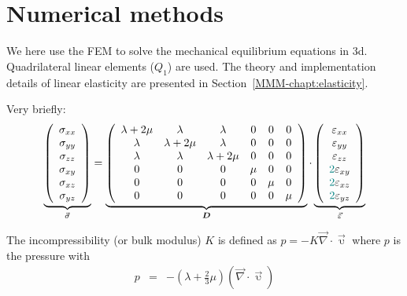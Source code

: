 \section*{Numerical methods}

We here use the FEM to solve the mechanical equilibrium equations in 3d.
Quadrilateral linear elements ($Q_1$) are used.
The theory and implementation details of linear elasticity
are presented in Section~\ref{MMM-chapt:elasticity}.

Very briefly:
\begin{equation}
\underbrace{
\left( \begin{array}{c}
\sigma_{xx} \\
\sigma_{yy} \\
\sigma_{zz} \\
\sigma_{xy} \\
\sigma_{xz} \\
\sigma_{yz} 
\end{array} \right)}
_{\vec{\sigma}}
=
\underbrace{
\left( \begin{array}{cccccc}
\lambda+2\mu & \lambda & \lambda & 0 & 0 & 0 \\ 
\lambda & \lambda+2\mu & \lambda & 0 & 0 & 0 \\ 
\lambda & \lambda & \lambda+2\mu & 0 & 0 & 0 \\
0 & 0 & 0 & \mu & 0 & 0 \\ 
0 & 0 & 0 & 0 & \mu & 0 \\ 
0 & 0 & 0 & 0 & 0 & \mu  
\end{array} \right)}
_{{\bm D}}
\cdot
\underbrace{
\left( \begin{array}{c}
\varepsilon_{xx} \\
\varepsilon_{yy} \\
\varepsilon_{zz} \\
{\color{teal}2}\varepsilon_{xy} \\
{\color{teal}2}\varepsilon_{xz} \\
{\color{teal}2}\varepsilon_{yz} 
\end{array} \right)}
_{\vec{\varepsilon}}
\label{eq:el:vectors}
\end{equation}

The incompressibility (or bulk modulus) $K$ is defined as 
$p=-K \vec{\nabla}\cdot\vec{\upupsilon}$ where $p$ is the pressure with 
\begin{eqnarray}
p &=& -\left( \lambda + \frac{2}{3} \mu \right) (\vec{\nabla}\cdot\vec{\upupsilon})  
\end{eqnarray}

